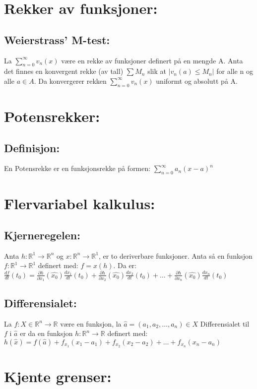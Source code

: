 \documentclass[12pt,a4paper,twocolumn,twoside]{article}
\def\abs#1{\lvert #1 \rvert}
\def\real{\mathbb{R}}
\def\suminfty#1#2{\sum_{n=#1}^\infty #2}
\def\der#1#2#3{\frac{d #1}{d #2}\left( #3 \right)}
\def\parder#1#2#3{\frac{\partial #1}{\partial #2}\left( #3 \right)}
\begin{document}
    \section*{Rekker av funksjoner:}
        \subsection*{Weierstrass' M-test:}
        La $\suminfty{0}{v_n(x)}$ være en rekke av funksjoner definert på en mengde A. Anta det finnes en konvergent rekke (av tall) $\sum M_n$ slik at 
        $\abs{v_n(a) \leq M_n}$ for alle n og alle $a\in A$. Da konvergerer rekken $\suminfty{0}{v_n(x)}$ uniformt og absolutt på A.
    \section*{Potensrekker:}
        \subsection*{Definisjon:}
        En Potensrekke er en funksjonsrekke på formen: $\suminfty{0}{a_n(x-a)^n}$

    \section*{Flervariabel kalkulus:}
        \subsection*{Kjerneregelen:}
            Anta $h:\real^1\to\real^n$ og $x:\real^n\to\real^1$, er to deriverbare funksjoner. Anta så en funksjon $f:\real^1\to\real^1$ definert med:
            $f = x(h)$. Da er:
            $\der{f}{t}{t_0}=\parder{h}{x_1}{\hat{x_0}}\der{x_1}{t}{t_0}+\parder{h}{x_2}{\hat{x_0}}\der{x_2}{t}{t_0}+\dots+\parder{h}{x_n}{\hat{x_0}}\der{x_n}{t}{t_0}$
        \subsection*{Differensialet:}
        La $f:X\in\real^n\to\real$ være en funksjon, la $\hat{a}=(a_1,a_2,\dots,a_n)\in X$ Differensialet til $f$ i $\hat{a}$ er da en funksjon $h:\real^n\to\real$ definert
        med: $h(\hat{x})=f(\hat{a})+f_{x_1}(x_1-a_1)+f_{x_2}(x_2-a_2)+\dots+f_{x_n}(x_n-a_n)$
    \section*{Kjente grenser:}
\end{document}
